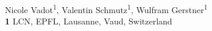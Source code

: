 \documentclass[10pt,letterpaper]{article}
\begin{document}
\vspace*{0.2in}

\begin{flushleft}
{\Large
\textbf{} %
}
\newline
\\
Nicole Vadot\textsuperscript{1},
Valentin Schmutz\textsuperscript{1},
Wulfram Gerstner\textsuperscript{1}
\\
\bigskip
\textbf{1} LCN, EPFL, Lausanne, Vaud, Switzerland
\bigskip

% 
%






\end{flushleft}
\end{document}
